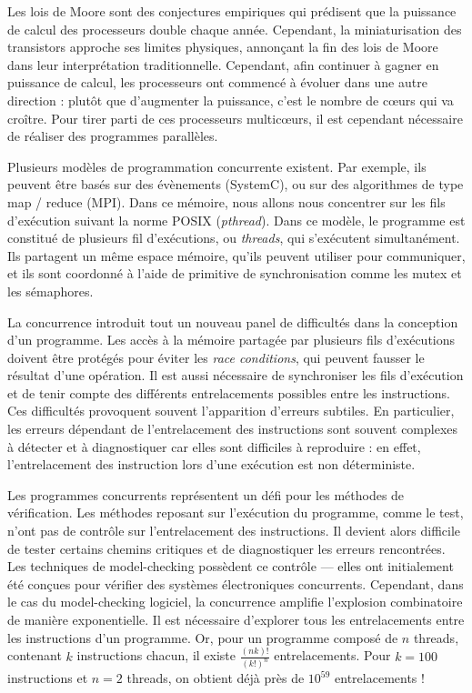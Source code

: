 Les lois de Moore sont des conjectures empiriques qui prédisent que la
puissance de calcul des processeurs double chaque année. Cependant, la
miniaturisation des transistors approche ses limites physiques,
annonçant la fin des lois de Moore dans leur interprétation
traditionnelle. Cependant, afin continuer à gagner en puissance de
calcul, les processeurs ont commencé à évoluer dans une autre direction
: plutôt que d'augmenter la puissance, c'est le nombre de cœurs qui va
croître. Pour tirer parti de ces processeurs multicœurs, il est
cependant nécessaire de réaliser des programmes parallèles.

Plusieurs modèles de programmation concurrente existent. Par exemple, ils
peuvent être basés sur des évènements (SystemC), ou sur des algorithmes
de type map / reduce (MPI). Dans ce mémoire, nous allons nous concentrer
sur les fils d'exécution suivant la norme POSIX (\emph{pthread}).
Dans ce modèle, le programme est constitué de plusieurs fil d'exécutions, ou
\emph{threads}, qui s'exécutent simultanément. Ils partagent un même espace
mémoire, qu'ils peuvent utiliser pour communiquer, et ils sont coordonné à
l'aide de primitive de synchronisation comme les mutex et les sémaphores.

La concurrence introduit tout un nouveau panel de difficultés dans la conception
d'un programme. Les accès à la mémoire partagée par plusieurs fils d'exécutions
doivent être protégés pour éviter les \emph{race conditions}, qui peuvent
fausser le résultat d'une opération. Il est aussi nécessaire de synchroniser les
fils d'exécution et de tenir compte des différents entrelacements possibles
entre les instructions. Ces difficultés provoquent souvent l'apparition
d'erreurs subtiles. En particulier, les erreurs dépendant de l'entrelacement des
instructions sont souvent complexes à détecter et à diagnostiquer car elles sont
difficiles à reproduire : en effet, l'entrelacement des instruction lors d'une
exécution est non déterministe.

Les programmes concurrents représentent un défi pour les méthodes de
vérification. Les méthodes reposant sur l'exécution du programme, comme
le test, n'ont pas de contrôle sur l'entrelacement des instructions. Il
devient alors difficile de tester certains chemins critiques et de
diagnostiquer les erreurs rencontrées. Les techniques de model-checking
possèdent ce contrôle --- elles ont initialement été conçues pour vérifier
des systèmes électroniques concurrents. Cependant, dans le cas du
model-checking logiciel, la concurrence amplifie l'explosion
combinatoire de manière exponentielle. Il est nécessaire d'explorer tous
les entrelacements entre les instructions d'un programme. Or, pour un
programme composé de \(n\) threads, contenant \(k\) instructions chacun,
il existe \(\frac{(nk)!}{(k!)^n}\) entrelacements. Pour \(k = 100\)
instructions et \(n = 2\) threads, on obtient déjà près de \(10^{59}\)
entrelacements !

